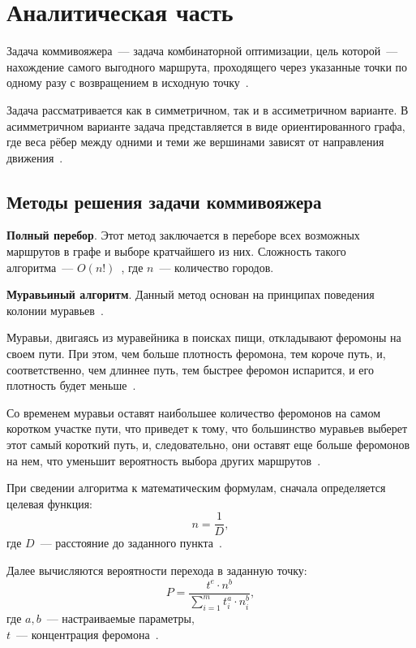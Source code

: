 \chapter{Аналитическая часть}

Задача коммивояжера~--- задача комбинаторной оптимизации, цель которой~--- нахождение самого выгодного маршрута, проходящего через указанные точки по одному разу с возвращением в исходную точку~\cite{tsp-about}.

Задача рассматривается как в симметричном, так и в ассиметричном варианте.
В асимметричном варианте задача представляется в виде ориентированного графа, где веса рёбер между одними и теми же вершинами зависят от направления движения~\cite{tsp-about}.

\section{Методы решения задачи коммивояжера}

\textbf{Полный перебор}.
Этот метод заключается в переборе всех возможных маршрутов в графе и выборе кратчайшего из них.
Сложность такого алгоритма~--- $O(n!)$~\cite{tsp-solutions}, где $n$~--- количество городов.

\textbf{Муравьиный алгоритм}.
Данный метод основан на принципах поведения колонии муравьев~\cite{tsp-solutions}.

Муравьи, двигаясь из муравейника в поисках пищи, откладывают феромоны на своем пути.
При этом, чем больше плотность феромона, тем короче путь, и, соответственно, чем длиннее путь, тем быстрее феромон испарится, и его плотность будет меньше~\cite{ants-alg}.

Со временем муравьи оставят наибольшее количество феромонов на самом коротком участке пути, что приведет к тому, что большинство муравьев выберет этот самый короткий путь, и, следовательно, они оставят еще больше феромонов на нем, что уменьшит вероятность выбора других маршрутов~\cite{ants-alg}.

При сведении алгоритма к математическим формулам, сначала определяется целевая функция:
\begin{equation}
	\label{eqn:target-func}
	n = \frac{1}{D},
\end{equation}
где $D$~--- расстояние до заданного пункта~\cite{ants-alg}.

Далее вычисляются вероятности перехода в заданную точку:
\begin{equation}
	P = \frac{t^e \cdot n^b}{\sum_{i=1}^{m} t_i^a \cdot n_i^b},
\end{equation}
где $a,b$~--- настраиваемые параметры,
\\ $t$~--- концентрация феромона~\cite{ants-alg}.

